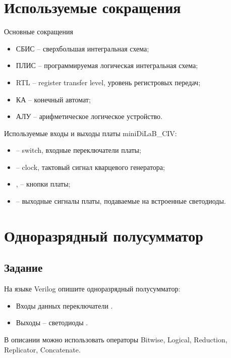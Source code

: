 \section*{Используемые сокращения}


\noindent Основные сокращения
\begin{itemize}
	\item СБИС -- сверхбольшая интегральная схема;
	\item ПЛИС -- программируемая логическая интегральная схема;
	\item RTL -- register transfer level, уровень регистровых передач;
	\item КА -- конечный автомат;
	\item АЛУ -- арифметическое логическое устройство.
\end{itemize}

\noindent Используемые входы и выходы платы miniDiLaB\_CIV:
\begin{itemize}
	\item {} -- switch, входные переключатели платы;
	\item {} -- clock, тактовый сигнал кварцевого генератора;
	\item {},  – кнопки платы;
	\item {} -- выходные сигналы платы, подаваемые на встроенные светодиоды.
\end{itemize}

\newpage

\section{Одноразрядный полусумматор}

\subsection{Задание}

На языке Verilog опишите одноразрядный полусумматор:
\begin{itemize}
	\item Входы данных переключатели .
	\item Выходы – светодиоды .
\end{itemize}
В описании можно использовать операторы Bitwise, Logical, Reduction, Replicator, Concatenate.

